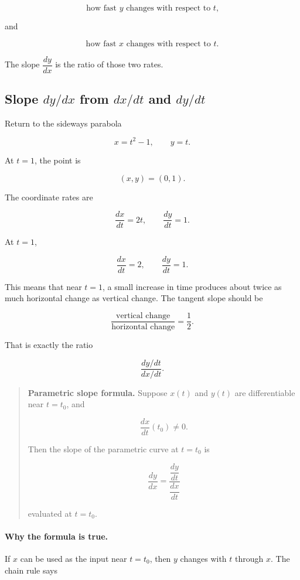\[
\text{how fast \(y\) changes with respect to \(t\),}
\]

and

\[
\text{how fast \(x\) changes with respect to \(t\).}
\]

The slope \(\dfrac{dy}{dx}\) is the ratio of those two rates.

\subsection{\texorpdfstring{Slope \(dy/dx\) from \(dx/dt\) and \(dy/dt\)}{Slope dy/dx from dx/dt and dy/dt}}
\label{subsec:parametric-slope-formula}

Return to the sideways parabola

\[
x=t^2-1,
\qquad
y=t.
\]

At \(t=1\), the point is

\[
(x,y)=(0,1).
\]

The coordinate rates are

\[
\frac{dx}{dt}=2t,
\qquad
\frac{dy}{dt}=1.
\]

At \(t=1\),

\[
\frac{dx}{dt}=2,
\qquad
\frac{dy}{dt}=1.
\]

This means that near \(t=1\), a small increase in time produces about twice as much
horizontal change as vertical change.  The tangent slope should be

\[
\frac{\text{vertical change}}{\text{horizontal change}}
=
\frac{1}{2}.
\]

That is exactly the ratio

\[
\frac{dy/dt}{dx/dt}.
\]

\begin{quote}
\textbf{Parametric slope formula.}
Suppose \(x(t)\) and \(y(t)\) are differentiable near \(t=t_0\), and

\[
\frac{dx}{dt}(t_0)\neq0.
\]

Then the slope of the parametric curve at \(t=t_0\) is

\[
\boxed{
\frac{dy}{dx}
=
\frac{\dfrac{dy}{dt}}{\dfrac{dx}{dt}}
}
\]

evaluated at \(t=t_0\).
\end{quote}

\paragraph{Why the formula is true.}
If \(x\) can be used as the input near \(t=t_0\), then \(y\) changes with \(t\) through
\(x\).  The chain rule says

